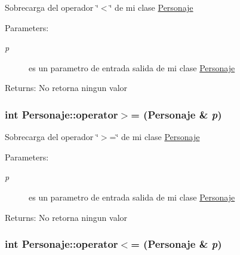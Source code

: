 Sobrecarga del operador \char`\"{}$<$\char`\"{} de mi clase \hyperlink{classPersonaje}{Personaje} \begin{Desc}
\item[Parameters:]
\begin{description}
\item[{\em p}]es un parametro de entrada salida de mi clase \hyperlink{classPersonaje}{Personaje} \end{description}
\end{Desc}
\begin{Desc}
\item[Returns:]No retorna ningun valor \end{Desc}
\hypertarget{classPersonaje_5b7fbb10c092e6f953738fa54a380e33}{
\subsubsection[operator$>$=]{\setlength{\rightskip}{0pt plus 5cm}int Personaje::operator$>$= ({\bf Personaje} \& {\em p})}}
\label{classPersonaje_5b7fbb10c092e6f953738fa54a380e33}


Sobrecarga del operador \char`\"{}$>$=\char`\"{} de mi clase \hyperlink{classPersonaje}{Personaje} \begin{Desc}
\item[Parameters:]
\begin{description}
\item[{\em p}]es un parametro de entrada salida de mi clase \hyperlink{classPersonaje}{Personaje} \end{description}
\end{Desc}
\begin{Desc}
\item[Returns:]No retorna ningun valor \end{Desc}
\hypertarget{classPersonaje_824156240864cc79a8b7319985eaec58}{
\subsubsection[operator$<$=]{\setlength{\rightskip}{0pt plus 5cm}int Personaje::operator$<$= ({\bf Personaje} \& {\em p})}}
\label{classPersonaje_824156240864cc79a8b7319985eaec58}


